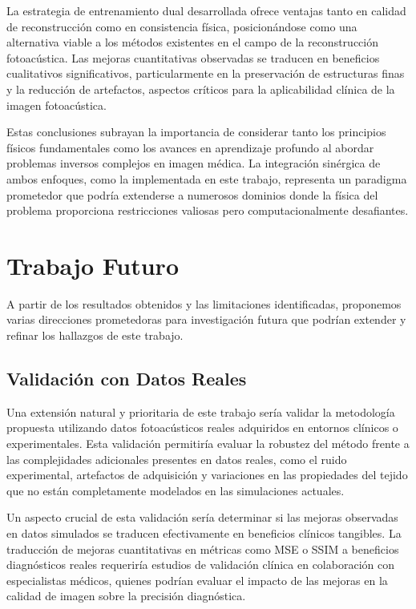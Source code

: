 La estrategia de entrenamiento dual desarrollada ofrece ventajas tanto en calidad de reconstrucción como en consistencia física, posicionándose como una alternativa viable a los métodos existentes en el campo de la reconstrucción fotoacústica. Las mejoras cuantitativas observadas se traducen en beneficios cualitativos significativos, particularmente en la preservación de estructuras finas y la reducción de artefactos, aspectos críticos para la aplicabilidad clínica de la imagen fotoacústica.

Estas conclusiones subrayan la importancia de considerar tanto los principios físicos fundamentales como los avances en aprendizaje profundo al abordar problemas inversos complejos en imagen médica. La integración sinérgica de ambos enfoques, como la implementada en este trabajo, representa un paradigma prometedor que podría extenderse a numerosos dominios donde la física del problema proporciona restricciones valiosas pero computacionalmente desafiantes.

\section{Trabajo Futuro}

A partir de los resultados obtenidos y las limitaciones identificadas, proponemos varias direcciones prometedoras para investigación futura que podrían extender y refinar los hallazgos de este trabajo.

\subsection{Validación con Datos Reales}

Una extensión natural y prioritaria de este trabajo sería validar la metodología propuesta utilizando datos fotoacústicos reales adquiridos en entornos clínicos o experimentales. Esta validación permitiría evaluar la robustez del método frente a las complejidades adicionales presentes en datos reales, como el ruido experimental, artefactos de adquisición y variaciones en las propiedades del tejido que no están completamente modelados en las simulaciones actuales.

Un aspecto crucial de esta validación sería determinar si las mejoras observadas en datos simulados se traducen efectivamente en beneficios clínicos tangibles. La traducción de mejoras cuantitativas en métricas como MSE o SSIM a beneficios diagnósticos reales requeriría estudios de validación clínica en colaboración con especialistas médicos, quienes podrían evaluar el impacto de las mejoras en la calidad de imagen sobre la precisión diagnóstica.

